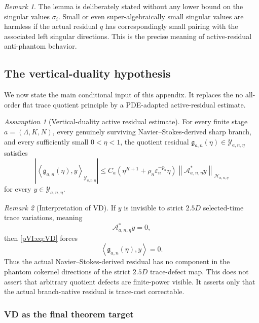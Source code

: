\documentclass[11pt]{article}
\numberwithin{equation}{section}
\theoremstyle{plain}
\theoremstyle{definition}
\theoremstyle{remark}
\newtheorem{assumption}{Assumption}[section]
\newtheorem{remark}{Remark}[section]
\newcommand{\eps}{\varepsilon}
\newcommand{\norm}[2]{\left\|#1\right\|_{#2}}
\newcommand{\inner}[2]{\left\langle #1,#2\right\rangle}
\newcommand{\calA}{\mathcal A}
\newcommand{\calH}{\mathcal H}
\newcommand{\calY}{\mathcal Y}
\begin{document}
\begin{remark}
The lemma is deliberately stated without any lower bound on the singular values \(\sigma_i\).
Small or even super-algebraically small singular values are harmless if the actual residual \(q\)
has correspondingly small pairing with the associated left singular directions.  This is the precise
meaning of active-residual anti-phantom behavior.
\end{remark}

\subsection{The vertical-duality hypothesis}

We now state the main conditional input of this appendix.  It replaces the no all-order flat trace quotient
principle by a PDE-adapted active-residual estimate.

\begin{assumption}[Vertical-duality active residual estimate]\label{pVI:ass:VD}
For every finite stage \(a=(\Lambda,K,N)\), every genuinely surviving Navier--Stokes-derived sharp
branch, and every sufficiently small \(0<\eta<1\), the quotient residual
\(\mathfrak g_{a,n}(\eta)\in\calY_{a,n,\eta}\) satisfies
\begin{equation}\label{pVI:eq:VD}
        \left|
        \inner{\mathfrak g_{a,n}(\eta)}{y}_{\calY_{a,n,\eta}}
        \right|
        \le
        C_a
        \left(
        \eta^{K+1}
        +
        \rho_n\eps_n^{-p_a}\eta
        \right)
        \norm{\calA_{a,n,\eta}^*y}{\calH_{a,n,\eta}}
\end{equation}
for every \(y\in\calY_{a,n,\eta}\).
\end{assumption}

\begin{remark}[Interpretation of VD]
If \(y\) is invisible to strict \(2.5D\) selected-time trace variations, meaning
\[
        \calA_{a,n,\eta}^*y=0,
\]
then \eqref{pVI:eq:VD} forces
\[
        \inner{\mathfrak g_{a,n}(\eta)}{y}=0.
\]
Thus the actual Navier--Stokes-derived residual has no component in the phantom cokernel directions
of the strict \(2.5D\) trace-defect map.  This does not assert that arbitrary quotient defects are
finite-power visible.  It asserts only that the actual branch-native residual is trace-cost correctable.
\end{remark}

\subsubsection{VD as the final theorem target}
\end{document}
